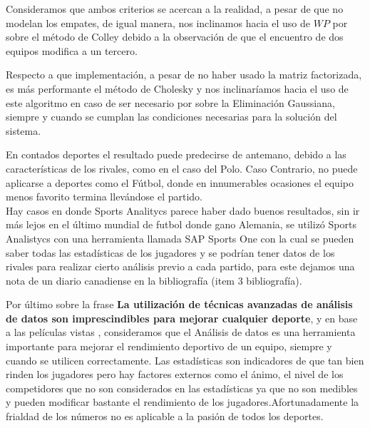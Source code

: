 Consideramos que ambos criterios se acercan a la realidad, a pesar de que no modelan los empates, de igual manera, nos inclinamos hacia el uso de $WP$ por sobre el método de Colley debido a la observación de que el encuentro de dos equipos modifica a un tercero.

Respecto a que implementación, a pesar de no haber usado la matriz factorizada, es más performante el método de Cholesky y nos inclinaríamos hacia el uso de este algoritmo en caso de ser necesario por sobre la Eliminación Gaussiana, siempre y cuando se cumplan las condiciones necesarias para la solución del sistema.

En contados deportes el resultado puede predecirse de antemano, debido a las características de los rivales, como en el caso del Polo. Caso Contrario, no puede aplicarse a deportes como el Fútbol, donde en innumerables ocasiones el equipo menos favorito termina llevándose el partido.\\
Hay casos en donde Sports Analitycs parece haber dado buenos resultados, sin ir m\'as lejos en el último mundial de futbol donde gano Alemania, se utilizó Sports Analistycs con una herramienta llamada SAP Sports One con la cual se pueden saber todas las estadísticas de los jugadores y se podrían tener datos de los rivales para realizar cierto análisis previo a cada partido, para este dejamos una nota de un diario canadiense en la bibliografía (item 3 bibliografía).

Por último sobre la frase \textbf{La utilización de técnicas avanzadas de análisis de datos son imprescindibles para mejorar cualquier deporte}, y en base a las películas vistas , consideramos que el Análisis de datos es una herramienta importante para mejorar el rendimiento deportivo de un equipo, siempre y cuando se utilicen correctamente. Las estadísticas son indicadores de que tan bien rinden los jugadores pero hay factores externos como el ánimo, el nivel de los competidores que no son considerados en las estadísticas ya que no son medibles y pueden modificar bastante el rendimiento de los jugadores.Afortunadamente la frialdad de los números no es aplicable a la pasión de todos los deportes.
